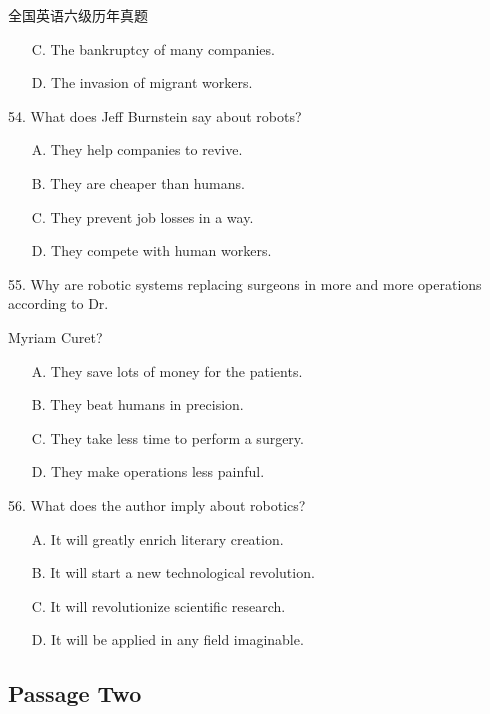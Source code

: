 \documentclass[UTF8,11pt]{ctexart}
\begin{document}
全国英语六级历年真题


\begin{itemize}[leftmargin=2em,itemsep=.2em,topsep=.4em]\item[C.] The bankruptcy of many companies.
\item[D.] The invasion of migrant workers.
\end{itemize}

54. What does Jeff Burnstein say about robots?


\begin{itemize}[leftmargin=2em,itemsep=.2em,topsep=.4em]\item[A.] They help companies to revive.
\item[B.] They are cheaper than humans.
\item[C.] They prevent job losses in a way.
\item[D.] They compete with human workers.
\end{itemize}

55. Why are robotic systems replacing surgeons in more and more operations according to Dr.


Myriam Curet?


\begin{itemize}[leftmargin=2em,itemsep=.2em,topsep=.4em]\item[A.] They save lots of money for the patients.
\item[B.] They beat humans in precision.
\item[C.] They take less time to perform a surgery.
\item[D.] They make operations less painful.
\end{itemize}

56. What does the author imply about robotics?


\begin{itemize}[leftmargin=2em,itemsep=.2em,topsep=.4em]\item[A.] It will greatly enrich literary creation.
\item[B.] It will start a new technological revolution.
\item[C.] It will revolutionize scientific research.
\item[D.] It will be applied in any field imaginable.
\end{itemize}

\subsection*{\textbf{Passage Two}}
\end{document}

